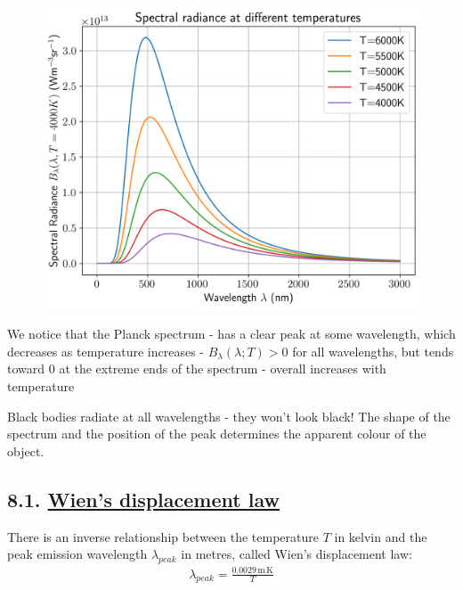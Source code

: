 \documentclass[
  letterpaper,
  DIV=11,
  numbers=noendperiod]{scrartcl}
\begin{document}
\begin{figure}[H]

{\centering \includegraphics{SP1.1_-_Stellar_Properties_files/figure-pdf/cell-22-output-1.png}

}

\end{figure}

We notice that the Planck spectrum - has a clear peak at some
wavelength, which decreases as temperature increases -
\(B_\lambda(\lambda;T)> 0\) for all wavelengths, but tends toward \(0\)
at the extreme ends of the spectrum - overall increases with temperature

Black bodies radiate at all wavelengths - they won't look black! The
shape of the spectrum and the position of the peak determines the
apparent colour of the object.

\hypertarget{wiens-displacement-law}{%
\subsection{\texorpdfstring{8.1. \protect\hyperlink{toc0_}{Wien's
displacement
law}}{8.1. Wien's displacement law}}\label{wiens-displacement-law}}

There is an inverse relationship between the temperature \(T\) in kelvin
and the peak emission wavelength \(\lambda_{peak}\) in metres, called
Wien's displacement law: \begin{align}
\lambda_{peak} = \frac{0.0029\,\mathrm{m\,K}}{T}
\end{align}
\end{document}
